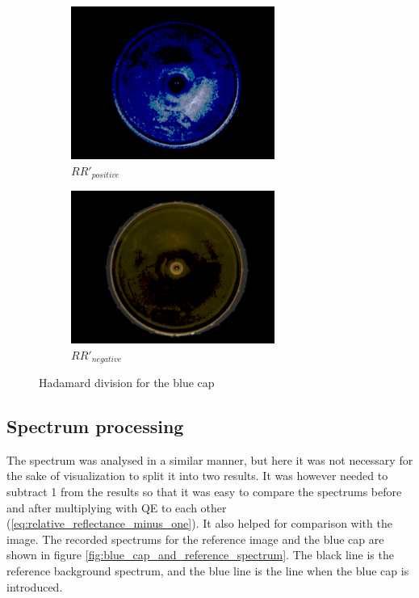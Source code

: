 \begin{figure}[h]
        \begin{subfigure}{0.5\textwidth}
            \includegraphics[width=0.9\linewidth, height=5cm]{figures/processed_camera_pictures/002_blue_cap_positive_difference.png}
            \caption{$RR'_{positive}$}
            \label{fig:002_blue_cap_positive_difference}
        \end{subfigure}%
        \begin{subfigure}{0.5\textwidth}
            \includegraphics[width=0.9\linewidth, height=5cm]{figures/processed_camera_pictures/002_blue_cap_negative_difference.png} 
            \caption{$RR'_{negative}$}
            \label{fig:002_blue_cap_negative_difference}
    \end{subfigure}
    
    \caption{Hadamard division for the blue cap}
    \label{fig:hadamard_division_blue_cap}
\end{figure}

\subsection{Spectrum processing}

The spectrum was analysed in a similar manner, but here it was not necessary for the sake of visualization to split it into two results. It was however needed to subtract 1 from the results so that it was easy to compare the spectrums before and after multiplying with QE to each other (\ref{eq:relative_reflectance_minus_one}). It also helped for comparison with the image. 
The recorded spectrums for the reference image and the blue cap are shown in figure \ref{fig:blue_cap_and_reference_spectrum}. The black line is the reference background spectrum, and the blue line is the line when the blue cap is introduced. 

